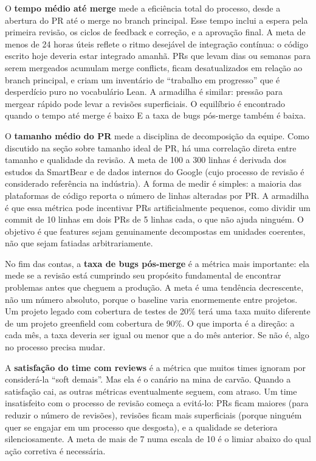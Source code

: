 O \textbf{tempo médio até merge} mede a eficiência total do processo, desde a
abertura do PR até o merge no branch principal. Esse tempo inclui a espera pela
primeira revisão, os ciclos de feedback e correção, e a aprovação final. A meta de
menos de 24 horas úteis reflete o ritmo desejável de integração contínua: o código
escrito hoje deveria estar integrado amanhã. PRs que levam dias ou semanas para serem
mergeados acumulam merge conflicts, ficam desatualizados em relação ao branch
principal, e criam um inventário de ``trabalho em progresso'' que é desperdício puro
no vocabulário Lean. A armadilha é similar: pressão para mergear rápido pode levar a
revisões superficiais. O equilíbrio é encontrado quando o tempo até merge é baixo E
a taxa de bugs pós-merge também é baixa.

O \textbf{tamanho médio do PR} mede a disciplina de decomposição da equipe. Como
discutido na seção sobre tamanho ideal de PR, há uma correlação direta entre tamanho
e qualidade da revisão. A meta de 100 a 300 linhas é derivada dos estudos da SmartBear
e de dados internos do Google (cujo processo de revisão é considerado referência na
indústria). A forma de medir é simples: a maioria das plataformas de código reporta
o número de linhas alteradas por PR. A armadilha é que essa métrica pode incentivar
PRs artificialmente pequenos, como dividir um commit de 10 linhas em dois PRs de 5 linhas
cada, o que não ajuda ninguém. O objetivo é que features sejam genuinamente decompostas em
unidades coerentes, não que sejam fatiadas arbitrariamente.

No fim das contas, a \textbf{taxa de bugs pós-merge} é a métrica mais importante:
ela mede se a revisão está cumprindo seu propósito fundamental de encontrar problemas
antes que cheguem a produção. A meta é uma tendência decrescente, não um número
absoluto, porque o baseline varia enormemente entre projetos. Um projeto legado com
cobertura de testes de 20\% terá uma taxa muito diferente de um projeto greenfield com
cobertura de 90\%. O que importa é a direção: a cada mês, a taxa deveria ser igual
ou menor que a do mês anterior. Se não é, algo no processo precisa mudar.

A \textbf{satisfação do time com reviews} é a métrica que muitos times ignoram por
considerá-la ``soft demais''. Mas ela é o canário na mina de carvão. Quando a
satisfação cai, as outras métricas eventualmente seguem, com atraso. Um time
insatisfeito com o processo de revisão começa a evitá-lo: PRs ficam maiores (para
reduzir o número de revisões), revisões ficam mais superficiais (porque ninguém quer
se engajar em um processo que desgosta), e a qualidade se deteriora silenciosamente.
A meta de mais de 7 numa escala de 10 é o limiar abaixo do qual ação corretiva é
necessária.

